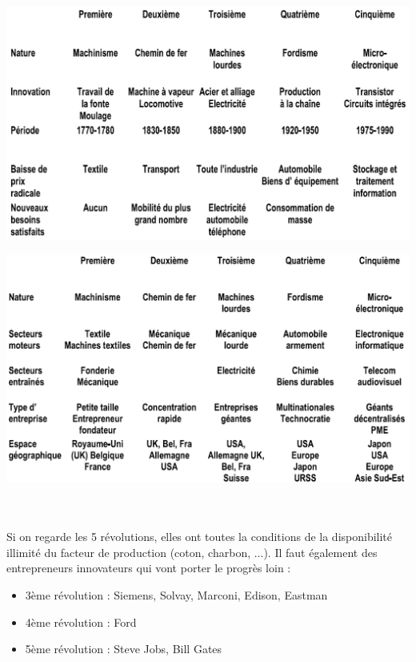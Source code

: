 \begin{minipage}{0.5\textwidth}
	\begin{flushleft}
		\includegraphics[scale=0.26]{60}
	\end{flushleft}
\end{minipage}
\begin{minipage}{0.5\textwidth}
	\begin{center}
		\includegraphics[scale=0.29]{61}
	\end{center}
\end{minipage}
\\\\
Si on regarde les 5 révolutions, elles ont toutes la conditions de la disponibilité illimité du facteur de production (coton, charbon, ...). Il faut également des entrepreneurs innovateurs qui vont porter le progrès loin : 

\begin{itemize}
	\item 3ème révolution : Siemens, Solvay, Marconi, Edison, Eastman
	\item 4ème révolution : Ford
	\item 5ème révolution : Steve Jobs, Bill Gates
\end{itemize}

